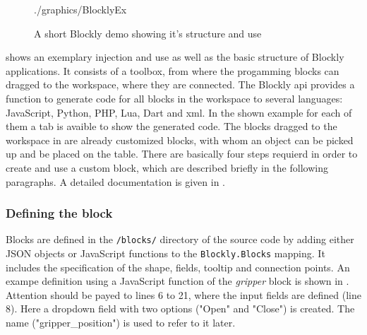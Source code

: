 \begin{figure}[htbp]
	\centering
	\begin{overpic}[width=0.9\linewidth]{./graphics/BlocklyEx}
	\end{overpic}
	\caption{A short Blockly demo showing it's structure and use}%
	\label{fig:BlocklyEx}%
\end{figure}

 shows an exemplary injection and use as well as the basic structure of Blockly applications. It consists of a toolbox, from where the progamming blocks can dragged to the workspace, where they are connected. The Blockly \gls{api} \cite{BlocklyAPI} provides a function to generate code for all blocks in the workspace to several languages: JavaScript, Python, PHP, Lua, Dart and \gls{xml}. In the shown example for each of them a tab is avaible to show the generated code. The blocks dragged to the workspace in  are already customized blocks, with whom an object can be picked up and be placed on the table. There are basically four steps requierd in order to create and use a custom block, which are described briefly in the following paragraphs. A detailed documentation is given in \cite{BlocklyCustomBlocks}.

\subsubsection{Defining the block}
Blocks are defined in the \lstinline!/blocks/! directory of the source code by adding either JSON objects or JavaScript functions to the \lstinline!Blockly.Blocks! mapping. It includes the specification of the shape, fields, tooltip and connection points. An exampe definition using a JavaScript function of the \textit{gripper} block is shown in . Attention should be payed to lines 6 to 21, where the input fields are defined (line 8). Here a dropdown field with two options ("Open" and "Close") is created. The name ("gripper\_position") is used to refer to it later.

\begin{figure}[htbp]
	
\end{figure}

